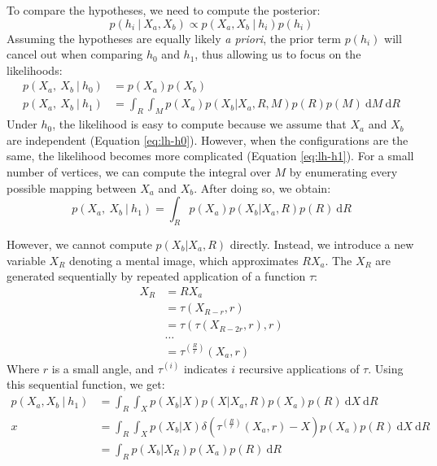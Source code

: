 \documentclass{article} %
\begin{document}
To compare the hypotheses, we need to compute the posterior:
\begin{equation}
p(h_i\ \vert\ X_a, X_b)\propto p(X_a, X_b\ \vert\ h_i)p(h_i)
\end{equation}
Assuming the hypotheses are equally likely \textit{a priori}, the
prior term $p(h_i)$ will cancel out when comparing $h_0$ and $h_1$,
thus allowing us to focus on the likelihoods: 
\begin{align}
  p(X_a,\ X_b\ \vert \ h_0)&=p(X_a)p(X_b) \label{eq:lh-h0}\\
  p(X_a,\ X_b\ \vert \ h_1)&=\int_R\int_M p(X_a) p(X_b\vert X_a,R,M) p(R) p(M)\ \mathrm{d}M\ \mathrm{d}R \label{eq:lh-h1}
\end{align}
Under $h_0$, the likelihood is easy to compute because we assume that
$X_a$ and $X_b$ are independent (Equation \ref{eq:lh-h0}). However,
when the configurations are the same, the likelihood becomes more
complicated (Equation \ref{eq:lh-h1}). For a small number of vertices,
we can compute the integral over $M$ by enumerating every possible
mapping between $X_a$ and $X_b$. After doing so, we obtain:
\begin{equation} 
  p(X_a,\ X_b\ \vert \ h_1)=\int_R p(X_a) p(X_b\vert X_a,R) p(R)\ \mathrm{d}R
\end{equation}

However, we cannot compute $p(X_b\vert X_a, R)$ directly. Instead, we
introduce a new variable $X_R$ denoting a mental image, which
approximates $RX_a$. The $X_R$ are generated sequentially by repeated
application of a function $\tau$:
\begin{align}
  X_R&=RX_a\nonumber \\
  &=\tau(X_{R-r}, r)\nonumber \\
  &=\tau(\tau(X_{R-2r}, r), r)\nonumber \\
  &\ldots{}\nonumber \\
  &=\tau^{(\frac{R}{r})}(X_a, r)
  \label{eq:tau}
\end{align} 
Where $r$ is a small angle, and $\tau^{(i)}$ indicates $i$ recursive
applications of $\tau$. Using this sequential function, we get:
\begin{align}
  p(X_a, X_b\ \vert \ h_1)&=\int_R \int_{X} p(X_b\vert X) p(X\vert X_a, R)p(X_a)p(R)\ \mathrm{d}X\ \mathrm{d}R \nonumber \\
  x&= \int_R \int_X p(X_b\vert X)\delta(\tau^{(\frac{R}{r})}(X_a, r)-X)p(X_a)p(R)\ \mathrm{d}X\ \mathrm{d}R \nonumber \\
  &= \int_R p(X_b\vert X_R)p(X_a)p(R)\ \mathrm{d}R
\end{align}
\end{document}
